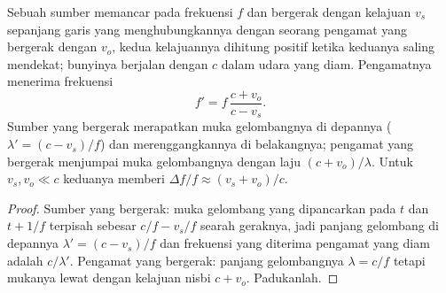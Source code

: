 \begin{theorem}\label{thm:b2:sound-waves:doppler}
Sebuah sumber memancar pada frekuensi $f$ dan bergerak dengan kelajuan $v_s$ sepanjang garis
yang menghubungkannya dengan seorang pengamat yang bergerak dengan $v_o$, kedua kelajuannya dihitung
positif ketika keduanya saling mendekat; bunyinya berjalan dengan $c$ dalam
udara yang diam. Pengamatnya menerima frekuensi
\[
f' = f\,\frac{c + v_o}{c - v_s} .
\]
Sumber yang bergerak merapatkan muka gelombangnya di depannya ($\lambda' = (c - v_s)/f$)
dan merenggangkannya di belakangnya; pengamat yang bergerak menjumpai muka gelombangnya dengan
laju $(c + v_o)/\lambda$. Untuk $v_s, v_o \ll c$ keduanya memberi $\Delta f/f \approx
(v_s + v_o)/c$.
\end{theorem}

\begin{proof}
Sumber yang bergerak: muka gelombang yang dipancarkan pada $t$ dan $t + 1/f$ terpisah
sebesar $c/f - v_s/f$ searah geraknya, jadi panjang gelombang di depannya
$\lambda' = (c - v_s)/f$ dan frekuensi yang diterima pengamat yang diam adalah
$c/\lambda'$. Pengamat yang bergerak: panjang gelombangnya $\lambda = c/f$ tetapi mukanya lewat
dengan kelajuan nisbi $c + v_o$. Padukanlah.
\end{proof}

